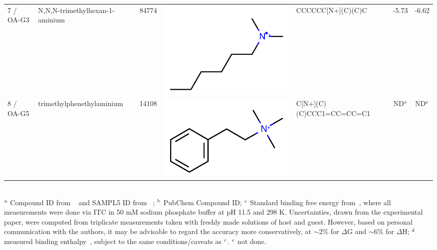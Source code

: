 \documentclass[aps,pre,twocolumn,nofootinbib,superscriptaddress,10pt, final,tightenlines]{revtex4-1}
\begin{document}
\begin{table}
\begin{tabular}{lllp{1.5cm}>{\ttfamily}lS[table-format=-1.3, table-figures-uncertainty=1]S[table-format=-1.2, table-figures-uncertainty=1]}
7 / OA-G3    & N,N,N-trimethylhexan-1-aminium      & 84774            & \parbox[c]{1em}{\includegraphics[scale=0.15]{figures/84774.pdf}}    & CCCCCC[N+](C)(C)C                  & -5.73      & -6.62       \\ 
8 / OA-G5    & trimethylphenethylaminium           & 14108            & \parbox[c]{1em}{\includegraphics[scale=0.15]{figures/14108.pdf}}    & C[N+](C)(C)CCC1=CC=CC=C1           & {ND$^{\rm e}$}       & {ND$^{\rm e}$}      \\
\bottomrule
\end{tabular}\\
$^{\rm a}$ Compound ID from ~\cite{sullivan_binding_2016} and SAMPL5 ID from ~\cite{yin_sampl5_preprint}; $^{\rm b}$ PubChem Compound ID; $^{\rm c}$ Standard binding free energy from~\cite{sullivan_binding_2016}, where all measurements were done via ITC in 50 mM sodium phosphate buffer at pH 11.5 and 298 K. Uncertainties, drawn from the experimental paper, were computed from triplicate measurements taken with freshly made solutions of host and guest. However, based on personal communication with the authors, it may be advisable to regard the accuracy more conservatively, at $\sim$2\% for $\Delta$G and $\sim$6\% for $\Delta$H;  $^{\rm d}$ measured binding enthalpy~\cite{sullivan_binding_2016}, subject to the same conditions/caveats as $^{\rm c}$. $^{\rm e}$ not done.
\end{table}
\endgroup
\end{document}
